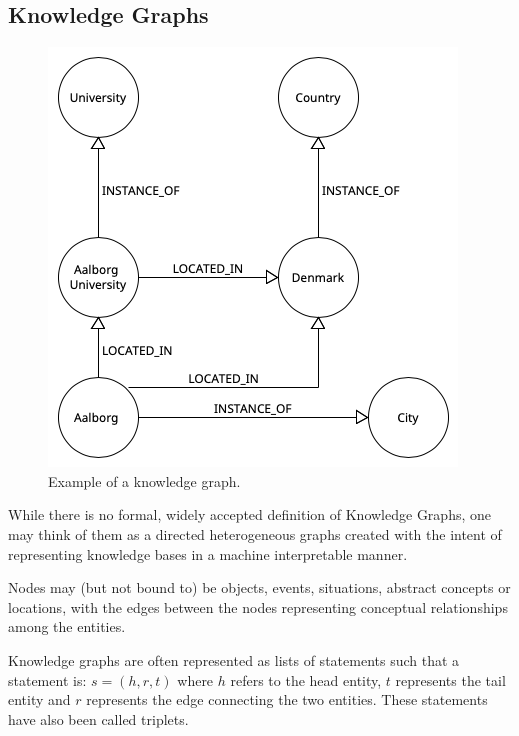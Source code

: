 
\subsection{Knowledge Graphs}\label{subsec:introduction-knowledge-graphs}

\begin{figure} %
    \centering
    \includegraphics[width=\linewidth, scale=0.5]{figures/kg-example}
    \caption{Example of a knowledge graph.}
    \label{fig:kg-example}
\end{figure}
While there is no formal, widely accepted definition of Knowledge Graphs, one may think of them as a directed heterogeneous graphs
created with the intent of representing knowledge bases in a machine interpretable manner.

Nodes may (but not bound to) be objects, events, situations, abstract concepts or locations,
with the edges between the nodes representing conceptual relationships among the entities.

Knowledge graphs are often represented as lists of statements such that a statement is: $s = (h,r,t)$
where $h$ refers to the head entity, $t$ represents the tail entity and $r$ represents the
edge connecting the two entities.
These statements have also been called triplets.


